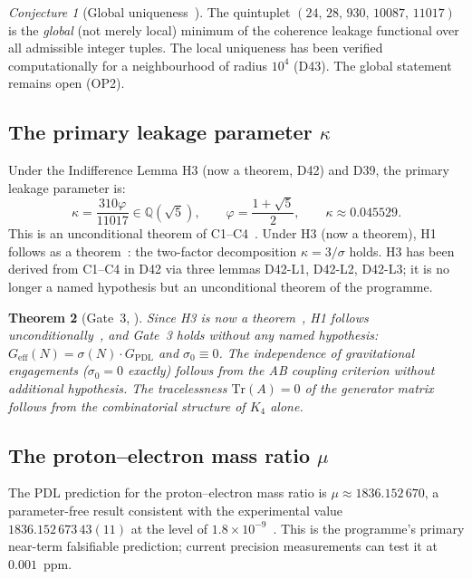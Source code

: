\documentclass[11pt,a4paper]{article}
\theoremstyle{plain}
\newtheorem{theorem}{Theorem}[section]
\theoremstyle{definition}
\theoremstyle{remark}
\newtheorem{conjecture}[theorem]{Conjecture}
\newcommand{\quintuplet}{(24,\,28,\,930,\,10087,\,11017)}
\newcommand{\Geff}{G_{\mathrm{eff}}}
\newcommand{\GPDL}{G_{\mathrm{PDL}}}
\newcommand{\sigmaN}{\sigma(N)}
\begin{document}
\begin{conjecture}[Global uniqueness~\cite{D16,D16b}]
\label{conj:uniqueness}
The quintuplet $\quintuplet$ is the \emph{global} (not merely local) minimum of the coherence leakage functional over all admissible integer tuples. The local uniqueness has been verified computationally for a neighbourhood of radius $10^4$ (D43). The global statement remains open (OP2).
\end{conjecture}

\subsection{The primary leakage parameter \texorpdfstring{$\kappa$}{kappa}}
\label{subsec:kappa}
Under the Indifference Lemma H3 (now a theorem, D42) and D39, the primary leakage parameter is:
\begin{equation}
\kappa = \frac{310\varphi}{11017} \in \mathbb{Q}(\sqrt{5}), \qquad \varphi = \frac{1+\sqrt{5}}{2}, \qquad \kappa \approx 0.045529.
\end{equation}
This is an unconditional theorem of C1--C4~\cite{D39,D42}. Under H3 (now a theorem), H1 follows as a theorem~\cite{D39}: the two-factor decomposition $\kappa=3/\sigma$ holds. H3 has been derived from C1--C4 in D42 via three lemmas D42-L1, D42-L2, D42-L3; it is no longer a named hypothesis but an unconditional theorem of the programme.

\begin{theorem}[Gate~3, \cite{D36}]
\label{thm:Gate3}
Since H3 is now a theorem~\cite{D42}, H1 follows unconditionally~\cite{D39}, and Gate~3 holds without any named hypothesis: $\Geff(N)=\sigmaN\cdot\GPDL$ and $\sigma_0\equiv 0$. The independence of gravitational engagements ($\sigma_0=0$ exactly) follows from the AB coupling criterion without additional hypothesis. The tracelessness $\mathrm{Tr}(A)=0$ of the generator matrix follows from the combinatorial structure of $K_4$ alone.
\end{theorem}

\subsection{The proton--electron mass ratio \texorpdfstring{$\mu$}{mu}}
\label{subsec:mu}
The PDL prediction for the proton--electron mass ratio is $\mu\approx 1836.152\,670$, a parameter-free result consistent with the experimental value $1836.152\,673\,43(11)$ at the level of $1.8\times10^{-9}$~\cite{D28,D29,D30}. This is the programme's primary near-term falsifiable prediction; current precision measurements can test it at $0.001$~ppm.
\end{document}
